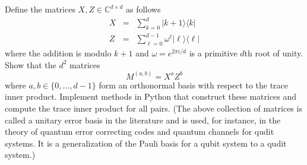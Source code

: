 \documentclass[12pt]{article}
\renewcommand{\>}{\rangle}
\newcommand{\<}{\langle}
\newcommand{\C}{\mathbb{C}}
\begin{document}
\noindent
Define the matrices $X,Z\in\C^{d\times d}$ as follows
\begin{eqnarray}
X & = & \sum_{k=0}^d |k+1\>\<k| \\
Z & = & \sum_{\ell=0}^{d-1} \omega^\ell |\ell\>\<\ell|
\end{eqnarray}
where the addition is modulo $k+1$ and $\omega=e^{2\pi i/d}$ is a primitive $d$th root of unity. Show that the $d^2$ matrices
\[
M^{(a,b)} = X^a Z^b
\]
where $a,b\in\{0,\ldots, d-1\}$ form an orthonormal basis with respect to the trace inner product. Implement methods in Python that construct these matrices and compute the trace inner product for all pairs. (The above collection of matrices is called a unitary error basis in the literature and is used, for instance, in the theory of quantum error correcting codes and quantum channels for qudit systems. It is a generalization of the Pauli basis for a qubit system to a qudit system.)
\end{document}
